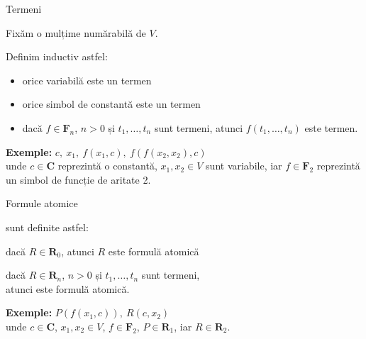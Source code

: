 \documentclass[xcolor=pdftex,romanian,colorlinks]{beamer}
\begin{document}
\begin{frame}{Termeni}

Fixăm o mulțime numărabilă de  $V$.

Definim  inductiv astfel:
\begin{itemize}
	\item orice variabilă este un termen
	\item orice simbol de constantă este un termen
	\item dacă $f\in \mathbf{F}_n$, $n > 0$ și $t_1,\ldots,t_n$ sunt termeni, atunci $f(t_1,\ldots,t_n)$ este termen.
\end{itemize}


\medskip
\textbf{\color{True}Exemple:} $c,\ x_1,\ f(x_1,c),\ f(f(x_2,x_2),c)$ \\
unde $c \in \mathbf{C}$ reprezintă o constantă, $x_1,x_2 \in V$ sunt variabile, iar $f \in \mathbf{F}_2$ reprezintă un simbol de funcție de 
aritate 2. 

\end{frame}

\begin{frame}{Formule atomice}

 sunt definite astfel:
\vspace{-1cm}
\begin{center}
	\item dacă $R\in \mathbf{R}_0$, atunci $R$ este formulă atomică
	\item dacă $R\in \mathbf{R}_n$, $n > 0$ și $t_1,\ldots,t_n$ sunt termeni, \\ atunci  este formulă atomică.
\end{center}

\medskip 
\textbf{\color{True}Exemple:} $P(f(x_1,c)),\ R(c,x_2)$ \\
unde $c \in \mathbf C$, $x_1,x_2 \in V$, $f \in \mathbf{F}_2$, $P \in \mathbf{R}_1$, iar $R \in \mathbf{R}_2$.
\end{frame}
\end{document}
